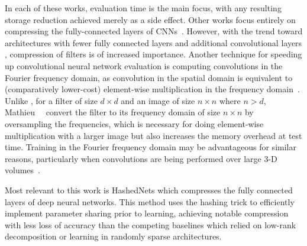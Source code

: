 \documentclass{article} %
\begin{document}
In each of these works, evaluation time is the main focus, with any resulting storage reduction achieved merely as a side effect.
Other works focus entirely on compressing the fully-connected layers of CNNs~\cite{gong2014compressing,yang2014deep}.
However, with the trend toward architectures with fewer fully connected layers and additional convolutional layers \cite{szegedy2014going}, compression of filters is of increased importance.
Another technique for speeding up convolutional neural network evaluation is computing convolutions in the Fourier frequency domain, as convolution in the spatial domain is equivalent to (comparatively lower-cost) element-wise multiplication in the frequency domain~\cite{mathieu2013,vasilache2014fast}.
Unlike \abbrev{}, for a filter of size $d\times d$ and an image of size $n\times n$ where $n>d$, Mathieu~\etal{}~\cite{mathieu2013} convert the filter to its frequency domain of size $n\times n$ by oversampling the frequencies, which is necessary for doing element-wise multiplication with a larger image but also increases the memory overhead at test time.
Training in the Fourier frequency domain may be advantageous for similar reasons, particularly when convolutions are being performed over large 3-D volumes~\cite{brosch2015efficient}.

Most relevant to this work is HashedNets \cite{chen2015compressing} which compresses the fully connected layers of deep neural networks.
This method uses the hashing trick to efficiently implement parameter sharing prior to learning, achieving notable compression with less loss of accuracy than the competing baselines which relied on low-rank decomposition or learning in randomly sparse architectures.
\end{document}
